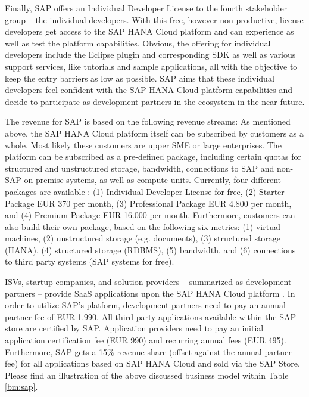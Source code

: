 Finally, SAP offers an Individual Developer License to the fourth stakeholder group -- the individual developers. With this free, however non-productive, license developers get access to the SAP HANA Cloud platform and can experience as well as test the platform capabilities. Obvious, the offering for individual developers include the Eclipse plugin and corresponding \ac{SDK} as well as various support services, like tutorials and sample applications, all with the objective to keep the entry barriers as low as possible. SAP aims that these individual developers feel confident with the SAP HANA Cloud platform capabilities and decide to participate as development partners in the ecosystem in the near future.

The revenue for SAP is based on the following revenue streams: As mentioned above, the SAP HANA Cloud platform itself can be subscribed by customers as a whole. Most likely these customers are upper \ac{SME} or large enterprises. The platform can be subscribed as a pre-defined package, including certain quotas for structured and unstructured storage, bandwidth, connections to SAP and non-SAP on-premise systems, as well as compute units. Currently, four different packages are available \citep{SAP2013b}: (1) Individual Developer License for free, (2) Starter Package \ac{EUR} 370 per month, (3) Professional Package \ac{EUR} 4.800 per month, and (4) Premium Package \ac{EUR} 16.000 per month. Furthermore, customers can also build their own package, based on the following six metrics: (1) virtual machines, (2) unstructured storage (e.g. documents), (3) structured storage (HANA), (4) structured storage (RDBMS), (5) bandwidth, and (6) connections to third party systems (SAP systems for free). 

\acp{ISV}, startup companies, and solution providers -- summarized as development partners -- provide \ac{SaaS} applications upon the SAP HANA Cloud platform \citep{SAP2013a}. In order to utilize SAP's platform, development partners need to pay an annual partner fee of \ac{EUR} 1.990. All third-party applications available within the SAP store are certified by SAP. Application providers need to pay an initial application certification fee (\ac{EUR} 990) and recurring annual fees (\ac{EUR} 495). Furthermore, SAP gets a 15\% revenue share (offset against the annual partner fee) for all applications based on SAP HANA Cloud and sold via the SAP Store. Please find an illustration of the above discussed business model within Table \ref{bm:sap}.




